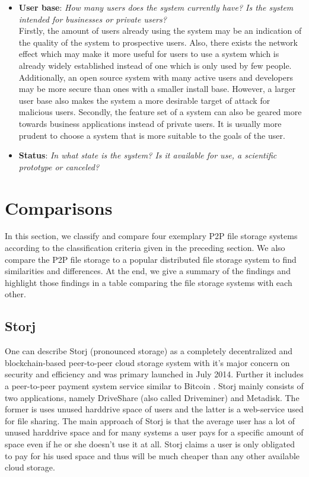 \begin{itemize}
\item \textbf{User base}: \textit{How many users does the system currently have? Is the system intended for businesses or private users?}\\
Firstly, the amount of users already using the system may be an indication of the quality of the system to prospective users. Also, there exists the network effect which may make it more useful for users to use a system which is already widely established instead of one which is only used by few people. Additionally, an open source system with many active users and developers may be more secure than ones with a smaller install base. However, a larger user base also makes the system a more desirable target of attack for malicious users. Secondly, the feature set of a system can also be geared more towards business applications instead of private users. It is usually more prudent to choose a system that is more suitable to the goals of the user.

\item \textbf{Status}: \textit{In what state is the system? Is it available for use, a scientific prototype or canceled?}
\end{itemize}
\section{Comparisons}
In this section, we classify and compare four exemplary P2P file storage systems according to the classification criteria given in the preceding section. We also compare the P2P file storage to a popular distributed file storage system to find similarities and differences. At the end, we give a summary of the findings and highlight those findings in a table comparing the file storage systems with each other.

\subsection{Storj} %
One can describe Storj (pronounced storage) as a completely decentralized and blockchain-based peer-to-peer cloud storage system with it's major concern on security and efficiency and was primary launched in July 2014. Further it includes a peer-to-peer payment system service similar to Bitcoin \cite{storj:blog:what_is_storj}. Storj mainly consists of two applications, namely DriveShare (also called Driveminer) and Metadisk. The former is uses unused harddrive space of users and the latter is a web-service used for file sharing. The main approach of Storj is that the average user has a lot of unused harddrive space and for many systems a user pays for a specific amount of space even if he or she doesn't use it at all. Storj claims a user is only obligated to pay for his used space and thus will be much cheaper than any other available cloud storage.

